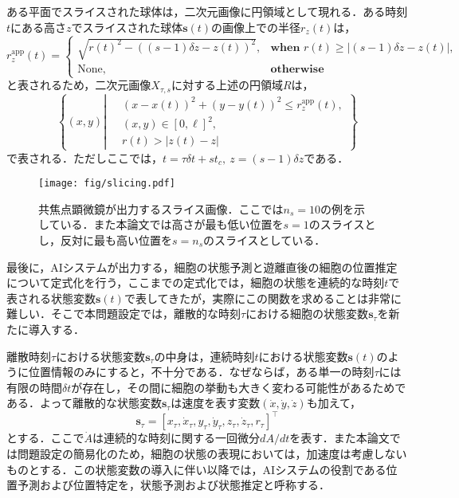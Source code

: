 ある平面でスライスされた球体は，二次元画像に円領域として現れる．ある時刻$t$にある高さ$z$でスライスされた球体$\bm{s}(t)$の画像上での半径$r_{z}(t)$は，
\begin{equation}
    \label{eq:appearant_radius}
    r_{z}^{\text{app}}(t) = 
    \begin{cases}
        \sqrt{r(t)^2 - \left((s - 1)\delta z - z(t)\right)^2}, & \textbf{when } r(t) \geq \left|(s - 1)\delta z - z(t)\right|,
        \\ \text{None}, & \textbf{otherwise}
    \end{cases}
\end{equation}
と表されるため，二次元画像$X_{\tau, s}$に対する上述の円領域$R$は，
\begin{equation}
    \label{eq:circle_region}
    \left\{ (x, y) \left| ~ 
        \begin{aligned}
            &(x - x(t))^2 + (y - y(t))^2 \leq r_z^{\text{app}}(t),
            \\ & (x, y) \in [0, \ell]^2,
            \\ & r(t) > \left|z(t) - z\right|
        \end{aligned}
    \right.
    \right\}
\end{equation}
で表される．ただしここでは，$t = \tau \delta t + s t_c, ~ z = (s -1 ) \delta z$である．

\begin{figure}[t]
    \centering
    \texttt{[image: fig/slicing.pdf]}
    \caption[共焦点顕微鏡が出力するスライス画像]{共焦点顕微鏡が出力するスライス画像．ここでは$n_s=10$の例を示している．また本論文では高さが最も低い位置を$s=1$のスライスとし，反対に最も高い位置を$s=n_s$のスライスとしている．}
    \label{fig:sliced_image}
\end{figure}

最後に，AIシステムが出力する，細胞の状態予測と遊離直後の細胞の位置推定について定式化を行う，ここまでの定式化では，細胞の状態を連続的な時刻$t$で表される状態変数$\bm{s}(t)$で表してきたが，実際にこの関数を求めることは非常に難しい．そこで本問題設定では，離散的な時刻$\tau$における細胞の状態変数$\bm{s}_{\tau}$を新たに導入する．

離散時刻$\tau$における状態変数$\bm{s}_{\tau}$の中身は，連続時刻$t$における状態変数$\bm{s}(t)$のように位置情報のみにすると，不十分である．なぜならば，ある単一の時刻$\tau$には有限の時間$\delta t$が存在し，その間に細胞の挙動も大きく変わる可能性があるためである．よって離散的な状態変数$\bm{s}_{\tau}$は速度を表す変数$(\dot{x}, \dot{y}, \dot{z})$も加えて，
\begin{equation}
    \label{eq:discreted_state_vector}
    \bm{s}_{\tau} = \left[x_{\tau}, \dot{x}_{\tau}, y_{\tau}, \dot{y}_{\tau}, z_{\tau}, \dot{z}_{\tau}, r_{\tau}\right]^{\top}
\end{equation}
とする．ここで$\dot{A}$は連続的な時刻に関する一回微分$dA/dt$を表す．また本論文では問題設定の簡易化のため，細胞の状態の表現においては，加速度は考慮しないものとする．この状態変数の導入に伴い以降では，AIシステムの役割である位置予測および位置特定を，状態予測および状態推定と呼称する．

